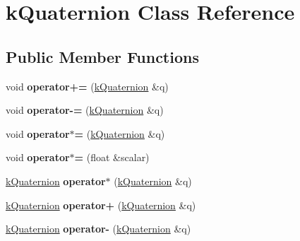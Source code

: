 \hypertarget{classkQuaternion}{}\section{k\+Quaternion Class Reference}
\label{classkQuaternion}
\subsection*{Public Member Functions}
\begin{DoxyCompactItemize}
\item 
void {\bfseries operator+=} (\hyperlink{classkQuaternion}{k\+Quaternion} \&q)\hypertarget{classkQuaternion_ad7cdf002b65f3b8834bc63d45085daaf}{}\label{classkQuaternion_ad7cdf002b65f3b8834bc63d45085daaf}

\item 
void {\bfseries operator-\/=} (\hyperlink{classkQuaternion}{k\+Quaternion} \&q)\hypertarget{classkQuaternion_ad119145d9e5026251501bd6e41aaa456}{}\label{classkQuaternion_ad119145d9e5026251501bd6e41aaa456}

\item 
void {\bfseries operator$\ast$=} (\hyperlink{classkQuaternion}{k\+Quaternion} \&q)\hypertarget{classkQuaternion_a094cdffdf4501a2e00020ffcc6e83765}{}\label{classkQuaternion_a094cdffdf4501a2e00020ffcc6e83765}

\item 
void {\bfseries operator$\ast$=} (float \&scalar)\hypertarget{classkQuaternion_abc194ebc9421ccd3f901a5121ce6fae0}{}\label{classkQuaternion_abc194ebc9421ccd3f901a5121ce6fae0}

\item 
\hyperlink{classkQuaternion}{k\+Quaternion} {\bfseries operator$\ast$} (\hyperlink{classkQuaternion}{k\+Quaternion} \&q)\hypertarget{classkQuaternion_ae3b067edd24a80b63e4bc9d2e2732f5a}{}\label{classkQuaternion_ae3b067edd24a80b63e4bc9d2e2732f5a}

\item 
\hyperlink{classkQuaternion}{k\+Quaternion} {\bfseries operator+} (\hyperlink{classkQuaternion}{k\+Quaternion} \&q)\hypertarget{classkQuaternion_ac2c240c40856d85c97643698814a4a4c}{}\label{classkQuaternion_ac2c240c40856d85c97643698814a4a4c}

\item 
\hyperlink{classkQuaternion}{k\+Quaternion} {\bfseries operator-\/} (\hyperlink{classkQuaternion}{k\+Quaternion} \&q)\hypertarget{classkQuaternion_ad3df490cbd3c7e4a435f7b7abfa80bf0}{}\label{classkQuaternion_ad3df490cbd3c7e4a435f7b7abfa80bf0}


\end{DoxyCompactItemize}
